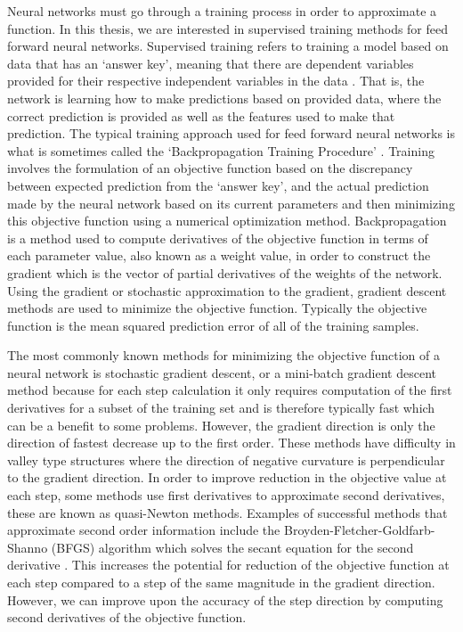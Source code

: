 \documentclass[letterpaper,12pt,titlepage,oneside,final]{book}
\begin{document}
	Neural networks must go through a training process in order to approximate a function. In this thesis, we are interested in supervised training methods for feed forward neural networks. Supervised training refers to training a model based on data that has an `answer key', meaning that there are dependent variables provided for their respective independent variables in the data \cite{hastie2009overview}. That is, the network is learning how to make predictions based on provided data, where the correct prediction is provided as well as the features used to make that prediction. The typical training approach used for feed forward neural networks is what is sometimes called the `Backpropagation Training Procedure' \cite{priddy2005artificial}. Training involves the formulation of an objective function based on the discrepancy between expected prediction from the `answer key', and the actual prediction made by the neural network based on its current parameters and then minimizing this objective function using a numerical optimization method. Backpropagation is a method used to compute derivatives of the objective function in terms of each parameter value, also known as a weight value, in order to construct the gradient which is the vector of partial derivatives of the weights of the network. Using the gradient or stochastic approximation to the gradient, gradient descent methods are used to minimize the objective function. Typically the objective function is the mean squared prediction error of all of the training samples. 
	
	The most commonly known methods for minimizing the objective function of a neural network is stochastic gradient descent, or a mini-batch gradient descent method because for each step calculation it only requires computation of the first derivatives for a subset of the training set and is therefore typically fast which can be a benefit to some problems. However, the gradient direction is only the direction of fastest decrease up to the first order. These methods have difficulty in valley type structures where the direction of negative curvature is perpendicular to the gradient direction. In order to improve reduction in the objective value at each step, some methods use first derivatives to approximate second derivatives, these are known as quasi-Newton methods. Examples of successful methods that approximate second order information include the Broyden-Fletcher-Goldfarb-Shanno (BFGS) algorithm which solves the secant equation for the second derivative \cite{Shepherd.1997}. This increases the potential for reduction of the objective function at each step compared to a step of the same magnitude in the gradient direction. However, we can improve upon the accuracy of the step direction by computing second derivatives of the objective function.
	
\end{document}
